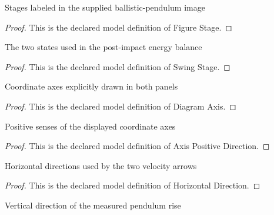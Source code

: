 \begin{definition}
  \label{def:physics:phyx-mini-0815:phyxminiproblems-problemphyxmini0815-figurestage}
  Stages labeled in the supplied ballistic-pendulum image
\end{definition}
\begin{proof}
  This is the declared model definition of Figure Stage.
\end{proof}
\begin{definition}
  \label{def:physics:phyx-mini-0815:phyxminiproblems-problemphyxmini0815-swingstage}
  The two states used in the post-impact energy balance
\end{definition}
\begin{proof}
  This is the declared model definition of Swing Stage.
\end{proof}
\begin{definition}
  \label{def:physics:phyx-mini-0815:phyxminiproblems-problemphyxmini0815-diagramaxis}
  Coordinate axes explicitly drawn in both panels
\end{definition}
\begin{proof}
  This is the declared model definition of Diagram Axis.
\end{proof}
\begin{definition}
  \label{def:physics:phyx-mini-0815:phyxminiproblems-problemphyxmini0815-axispositivedirection}
  Positive senses of the displayed coordinate axes
\end{definition}
\begin{proof}
  This is the declared model definition of Axis Positive Direction.
\end{proof}
\begin{definition}
  \label{def:physics:phyx-mini-0815:phyxminiproblems-problemphyxmini0815-horizontaldirection}
  Horizontal directions used by the two velocity arrows
\end{definition}
\begin{proof}
  This is the declared model definition of Horizontal Direction.
\end{proof}
\begin{definition}
  \label{def:physics:phyx-mini-0815:phyxminiproblems-problemphyxmini0815-verticaldirection}
  Vertical direction of the measured pendulum rise
\end{definition}
